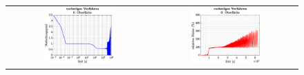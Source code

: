 \documentclass{listhesis}
\begin{document}
\clearpage
\newcommand\wss{0.5}
\begin{figure}[!h]
\centering
\begin{tabular}{@{}cc@{}}
\includegraphics[width=\wss\textwidth]{./include/figure_3.5/old/CovFacet0.eps}&
\includegraphics[width=\wss\textwidth]{./include/figure_3.5/old/CovFacetError0.eps}\\

\end{tabular}
\end{figure}
\end{document}
